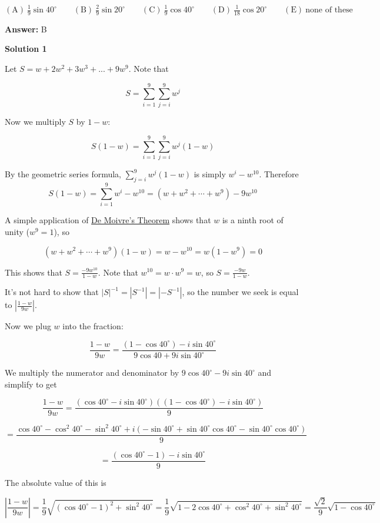 \begin{enumerate}
 $\mathrm{(A) \ }\frac{1}{9}\sin40^\circ \qquad \mathrm{(B) \ }\frac{2}{9}\sin20^\circ \qquad \mathrm{(C) \ } \frac{1}{9}\cos40^\circ \qquad \mathrm{(D) \ }\frac{1}{18}\cos20^\circ \qquad \mathrm{(E) \ } \text{none of these}$

 \textbf{Answer: }B



\textbf{Solution 1}

Let $S=w+2w^2+3w^3+...+9w^9$. Note that

 
 \[S=\sum_{i=1}^{9}\sum_{j=i}^{9} w^j\]

 Now we multiply $S$ by $1-w$:

 
 \[S(1-w)=\sum_{i=1}^{9}\sum_{j=i}^{9} w^j(1-w)\]

 By the geometric series formula, $\sum_{j=i}^{9} w^j(1-w)$ is simply $w^i-w^{10}$. Therefore
 \[S(1-w)=\sum_{i=1}^{9} w^i-w^{10}=(w+w^2+\cdots +w^9)-9w^{10}\]

 A simple application of \href{https://artofproblemsolving.com/wiki/index.php?title=De\_Moivre\%27s\_Theorem}{De Moivre's Theorem} shows that $w$ is a ninth root of unity ($w^9=1$), so

 
 \[(w+w^2+\cdots +w^9)(1-w)=w-w^{10}=w(1-w^{9})=0\]

 This shows that $S=\frac{-9w^{10}}{1-w}$. Note that $w^{10}=w\cdot w^9=w$, so $S=\frac{-9w}{1-w}$. 

 It's not hard to show that $\left|S\right|^{-1}=\left|S^{-1}\right|=\left|-S^{-1}\right|$, so the number we seek is equal to $\left|\frac{1-w}{9w}\right|$.

 Now we plug $w$ into the fraction:

 
 \[\frac{1-w}{9w}=\frac{(1-\cos{40^{\circ}})-i\sin{40^{\circ}}}{9\cos{40}+9i\sin{40^{\circ}}}\]

 We multiply the numerator and denominator by $9\cos{40^{\circ}}-9i\sin{40^{\circ}}$ and simplify to get

 
 \[\frac{1-w}{9w}=\frac{(\cos{40^{\circ}}-i\sin{40^{\circ}})((1-\cos{40^{\circ}})-i\sin{40^{\circ}})}{9}\]

 \[=\frac{\cos{40^{\circ}}-\cos^2{40^{\circ}}-\sin^2{40^{\circ}}+i(-\sin{40^{\circ}}+\sin{40^{\circ}}\cos{40^{\circ}}-\sin{40^{\circ}}\cos{40^{\circ}})}{9}\]

 \[=\frac{(\cos{40^{\circ}}-1)-i\sin{40^{\circ}}}{9}\]

 The absolute value of this is

 
 \[\left|\frac{1-w}{9w}\right|=\frac{1}{9}\sqrt{(\cos{40^{\circ}}-1)^2+\sin^2{40^{\circ}}}=\frac{1}{9}\sqrt{1-2\cos{40^{\circ}}+\cos^2{40^{\circ}}+\sin^2{40^{\circ}}}=\frac{\sqrt{2}}{9}\sqrt{1-\cos{40^{\circ}}}\]


\end{enumerate}
